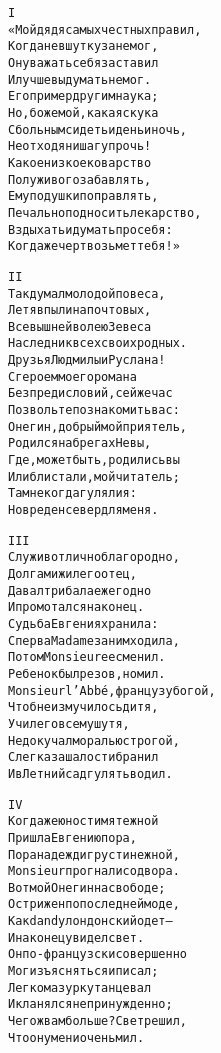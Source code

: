 \begin{minipage}[t]{\dimexpr 0.5\textwidth -\tabcolsep-.5pt}
\begin{alltt}\normalfont\centering
I
«Мой дядя самых честных правил,
Когда не в шутку занемог,
Он уважать себя заставил
И лучше выдумать не мог.
Его пример другим наука;
Но, боже мой, какая скука
С больным сидеть и день и ночь,
Не отходя ни шагу прочь!
Какое низкое коварство
Полуживого забавлять,
Ему подушки поправлять,
Печально подносить лекарство,
Вздыхать и думать про себя:
Когда же черт возьмет тебя!»
\end{alltt}
\end{minipage}

\begin{minipage}[t]{\dimexpr 0.5\textwidth -\tabcolsep-.5pt}
\begin{alltt}\normalfont\centering
II
Так думал молодой повеса,
Летя в пыли на почтовых,
Всевышней волею Зевеса
Наследник всех своих родных.
Друзья Людмилы и Руслана!
С героем моего романа
Без предисловий, сей же час
Позвольте познакомить вас:
Онегин, добрый мой приятель,
Родился на брегах Невы,
Где, может быть, родились вы
Или блистали, мой читатель;
Там некогда гулял и я:
Но вреден север для меня.
\end{alltt}
\end{minipage}
\clearpage

\begin{minipage}[t]{\dimexpr 0.5\textwidth -\tabcolsep-.5pt}
\begin{alltt}\normalfont\centering
III
Служив отлично благородно,
Долгами жил его отец,
Давал три бала ежегодно
И промотался наконец.
Судьба Евгения хранила:
Сперва Madame за ним ходила,
Потом Monsieur ее сменил.
Ребенок был резов, но мил.
Monsieur l'Abbé, француз убогой,
Чтоб не измучилось дитя,
Учил его всему шутя,
Не докучал моралью строгой,
Слегка за шалости бранил
И в Летний сад гулять водил.
\end{alltt}
\end{minipage}

\begin{minipage}[t]{\dimexpr 0.5\textwidth -\tabcolsep-.5pt}
\begin{alltt}\normalfont\centering
IV
Когда же юности мятежной
Пришла Евгению пора,
Пора надежд и грусти нежной,
Monsieur прогнали со двора.
Вот мой Онегин на свободе;
Острижен по последней моде,
Как dandy лондонский одет —
И наконец увидел свет.
Он по-французски совершенно
Мог изъясняться и писал;
Легко мазурку танцевал
И кланялся непринужденно;
Чего ж вам больше? Свет решил,
Что он умен и очень мил.
\end{alltt}
\end{minipage}
\clearpage

